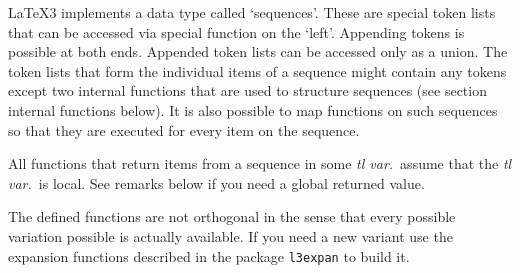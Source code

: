 \documentclass{article}
\begin{document}
\LaTeX3 implements a data type called `sequences'. These are special
 token lists that can be accessed via special function on the `left'.
 Appending tokens is possible at both ends. Appended token lists can be
 accessed only as a union.  The token lists that form the individual
 items of a sequence might contain any tokens except two internal
 functions that are used to structure sequences (see section internal
 functions below).  It is also possible to map functions on such
 sequences so that they are executed for every item on the sequence.

 All functions that return items from a sequence in some \emph{tl var.}~assume
 that the \emph{tl var.}~is local. See remarks below if you need a global
 returned value.

 The defined functions are not orthogonal in the sense that every
 possible variation possible is actually available. If you need a new
 variant use the expansion functions described in the package
 \texttt{l3expan} to build it.
\end{document}
